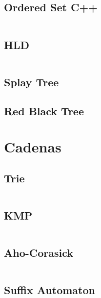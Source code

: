 \documentclass[11pt]{article}
\begin{document}
		\subsection{Ordered Set C++}
		\inputminted[tabsize=2,breaklines,firstline=935,lastline=969,fontsize=\small]{c++}{queries.cpp}
		
		\subsection{HLD}
		\inputminted[tabsize=2,breaklines,firstline=971,lastline=1037,fontsize=\small]{c++}{queries.cpp}
		
		\subsection{Splay Tree}
		
		
		\subsection{Red Black Tree}
		
		
	\newpage
	\section{Cadenas}
		\subsection{Trie}
		\inputminted[tabsize=2,breaklines,firstline=144,lastline=196,fontsize=\small]{c++}{strings.cpp}
		
		\subsection{KMP}
		\inputminted[tabsize=2,breaklines,firstline=4,lastline=39,fontsize=\small]{c++}{strings.cpp}
		
		\subsection{Aho-Corasick}
		\inputminted[tabsize=2,breaklines,firstline=41,lastline=142,fontsize=\small]{c++}{strings.cpp}

		\subsection{Suffix Automaton}
		\inputminted[tabsize=2,breaklines,firstline=198,lastline=239,fontsize=\small]{c++}{strings.cpp}
		
\end{document}
